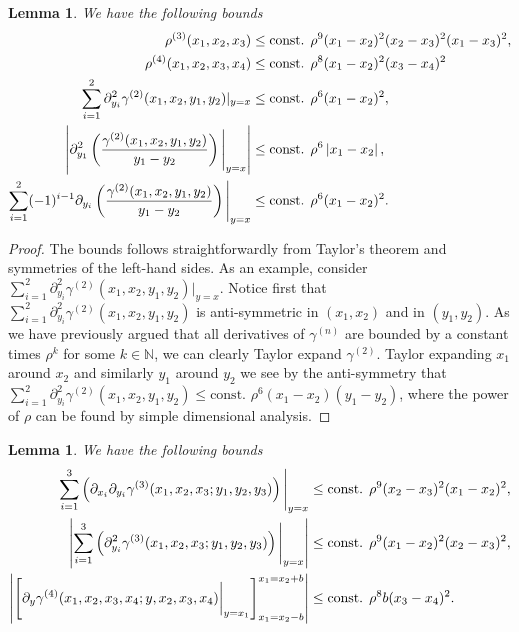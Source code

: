 \documentclass[a4paper,11pt]{article}
\newcommand{\abs}[1]{\left\lvert #1 \right\rvert}
\newtheorem{lemma}[theorem]{Lemma}
\numberwithin{equation}{section}
\begin{document}
	\begin{lemma}\label{LemmaDensityBounds}
		We have the following bounds\begin{equation}
		\begin{aligned}
		\rho^{(3)}(x_1,x_2,x_3)&\leq \textnormal{const. }\rho^9(x_1-x_2)^2(x_2-x_3)^2(x_1-x_3)^2,\\
		\rho^{(4)}(x_1,x_2,x_3,x_4)&\leq \textnormal{const. }\rho^8(x_1-x_2)^2(x_3-x_4)^2\\
		\sum_{i=1}^{2}\partial_{y_i}^2\gamma^{(2)}(x_1,x_2,y_1,y_2)\rvert_{y=x}&\leq \textnormal{const. } \rho^{6}(x_1-x_2)^2,\\
		\abs{\partial_{y_1}^2\left(\frac{\gamma^{(2)}(x_1,x_2,y_1,y_2)}{y_1-y_2}\right)\Bigg\rvert_{y=x}}&\leq \textnormal{const. } \rho^{6}\abs{x_1-x_2},\\
		\sum_{i=1}^{2}(-1)^{i-1}\partial_{y_i}\left(\frac{\gamma^{(2)}(x_1,x_2,y_1,y_2)}{y_1-y_2}\right)\Bigg\rvert_{y=x}&\leq \textnormal{const. } \rho^{6}(x_1-x_2)^2.
		\end{aligned}
		\end{equation}
	\end{lemma}
	\begin{proof}
		The bounds follows straightforwardly from Taylor's theorem and symmetries of the left-hand sides. As an example, consider $ \sum_{i=1}^{2}\partial_{y_i}^2\gamma^{(2)}(x_1,x_2,y_1,y_2)\rvert_{y=x} $. Notice first that $ \sum_{i=1}^{2}\partial_{y_i}^2\gamma^{(2)}(x_1,x_2,y_1,y_2) $ is anti-symmetric in $ (x_1,x_2) $ and in $ (y_1,y_2) $. As we have previously argued that all derivatives of $ \gamma^{(n)} $ are bounded by a constant times $ \rho^k $ for some $ k\in\mathbb{N} $, we can clearly Taylor expand $ \gamma^{(2)} $. Taylor expanding $ x_1 $ around $ x_2 $ and similarly $ y_1 $ around $ y_2 $ we see by the anti-symmetry that $ \sum_{i=1}^{2}\partial_{y_i}^2\gamma^{(2)}(x_1,x_2,y_1,y_2)\leq \text{const. }\rho^6(x_1-x_2)(y_1-y_2) $, where the power of $ \rho $ can be found by simple dimensional analysis.
	\end{proof}
	\begin{lemma} \label{LemmaDensityBounds2}
		We have the following bounds
		\begin{equation}
		\begin{aligned}
		\sum_{i=1}^{3}\left(\partial_{x_i}\partial_{y_i}\gamma^{(3)}(x_1,x_2,x_3;y_1,y_2,y_3)\right)\Bigg\vert_{y=x}&\leq \textnormal{const. }\rho^9(x_2-x_3)^2(x_1-x_2)^2,\\
		\abs{\sum_{i=1}^{3}\left(\partial_{y_i}^2\gamma^{(3)}(x_1,x_2,x_3;y_1,y_2,y_3)\right)\Bigg\vert_{y=x}}&\leq\textnormal{const. }\rho^9(x_1-x_2)^2(x_2-x_3)^2,\\
		\abs{\left[\partial_{y}\gamma^{(4)}(x_1,x_2,x_3,x_4;y,x_2,x_3,x_4)\bigg\vert_{y=x_1}\right]_{x_1=x_2-b}^{x_1=x_2+b}}&\leq \textnormal{const. }\rho^8b(x_3-x_4)^2.
		\end{aligned}
		\end{equation}
	\end{lemma}
\end{document}
